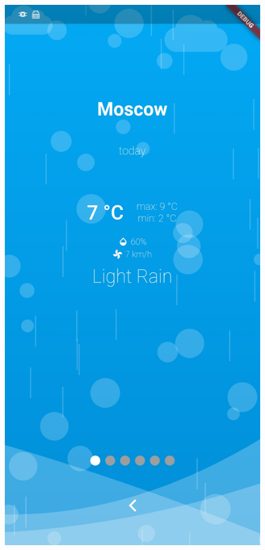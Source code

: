 \documentclass[12pt, a4paper]{article}
\begin{document}
\begin{figure}[!htb]
\endminipage\hfill
{}
  \includegraphics[width=\linewidth]{img/app-sleet.jpg}
\endminipage\hfill
{}%

\end{figure}
\end{document}
